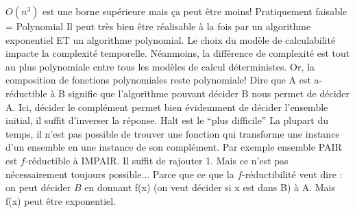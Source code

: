 \begin{mcqs}
  {}
  {$O(n^{3})$ est une borne supérieure mais ça peut être moins!}
  {}
  {Pratiquement faisable = Polynomial}
  {Il peut très bien être réalisable à la fois par un algorithme exponentiel ET un algorithme polynomial.}
  {Le choix du modèle de calculabilité impacte la complexité temporelle. Néanmoins, la différence de complexité est tout au plus polynomiale entre tous les modèles de calcul déterministes. Or, la composition de fonctions polynomiales reste polynomiale!}
  {Dire que A est a-réductible à B signifie que l'algorithme pouvant décider B nous permet de décider A. Ici, décider le complément permet bien évidemment de décider l'ensemble initial, il suffit d'inverser la réponse.}
  {Halt est le ``plus difficile''}
  {La plupart du temps, il n'est pas possible de trouver une fonction qui transforme une instance d'un ensemble en une instance de son complément. Par exemple ensemble PAIR est $f$-réductible à IMPAIR. Il suffit de rajouter 1. Mais ce n'est pas nécessairement toujours possible...}
  {Parce que ce que la $f$-réductibilité veut dire : on peut décider $B$ en donnant f(x) (on veut décider si x est dans B) à A. Mais f(x) peut être exponentiel.}
\end{mcqs}
